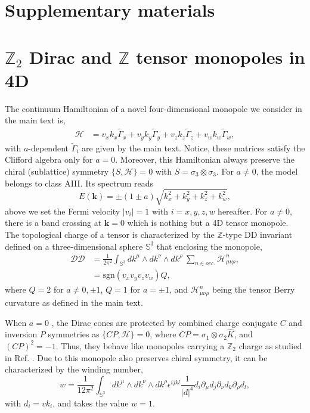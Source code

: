 \documentclass[twocolumn,prl,10pt,superscriptaddress]{revtex4}
\begin{document}
\clearpage
\newpage
\onecolumngrid
\begin{appendix}
\section*{\large{Supplementary materials}}

\section{$\mathbb{Z}_2$ Dirac and $\mathbb{Z}$ tensor monopoles in 4D}
The continuum Hamiltonian of a novel four-dimensional monopole we consider in the main text is,
\begin{equation}
\begin{aligned}\label{YMHam}
\mathcal{H}&=v_xk_x\tilde{\Gamma}_x+v_yk_y\tilde{\Gamma}_y+ v_zk_z\tilde{\Gamma}_z+v_wk_w\tilde{\Gamma}_w,
\end{aligned}
\end{equation}
with $a$-dependent $\tilde{\Gamma}_i$ are given by the main text. Notice, these matrices satisfy the Clifford algebra only for $a=0$.  Moreover, this Hamiltonian always preserve the chiral (sublattice) symmetry $\{S,\mathcal{H}\}=0$ with $S=\sigma_3\otimes\sigma_3$. For $a\neq 0$, the model belongs to class AIII. Its spectrum reads
\begin{equation}\label{Spectrum}
E(\boldsymbol k)=\pm(1\pm a) \sqrt{k_x^2+k_y^2+k_z^2+k_w^2},
\end{equation}
above we set the Fermi velocity $|v_i|=1$ with $i=x,y,z,w$ hereafter.
For $a\neq 0$, there is a band crossing at ${\boldsymbol k}=0$ which is nothing but a 4D tensor monopole. The topological charge of a tensor is characterized by the $\mathbb{Z}$-type DD invariant defined on a three-dimensional sphere $\mathbb{S}^3$ that enclosing the monopole,
\begin{equation}
\begin{aligned}
\mathcal{DD}&=\frac{1}{2\pi^2}\int_{\mathbb{S}^3}dk^{\mu}\wedge dk^{\nu}\wedge{dk^{\rho}}~
 \sum_{n\in occ.}\mathcal{H}^n_{\mu\nu\rho},\\
 &=\text{sgn}(v_xv_yv_zv_w)Q,
\end{aligned}
\end{equation}
where $Q=2$ for $a\neq 0, \pm1$, $Q=1$ for $a=\pm 1$, and $\mathcal{H}^n_{\mu\nu\rho}$ being the tensor Berry curvature as defined in the main text.

When $a=0$ , the Dirac cones are protected by combined charge conjugate $C$ and inversion $P$ symmetries  as $\{CP,\mathcal{H}\}=0$, where $CP=\sigma_1\otimes\sigma_2\hat{K}$, and $(CP)^2=-1$.  Thus, they behave like monopoles carrying a $\mathbb{Z}_2$ charge as studied in Ref. \cite{YXZhao2016}. Due to this monopole also preserves chiral symmetry, it can be characterized by the winding number,
\begin{equation}\label{WindEq}
w=\frac{1}{12\pi^2}\int_{\mathbb{S}^3}dk^{\mu}\wedge dk^{\nu}\wedge{dk^{\rho}}\epsilon^{ijkl}\frac{1}{|d|^4}d_i\partial_{\mu}d_j\partial_{\nu}d_k\partial_{\rho}d_l,
\end{equation}
with $d_i=v k_i$, and  takes the value $w=1$.


\end{appendix}
\end{document}
